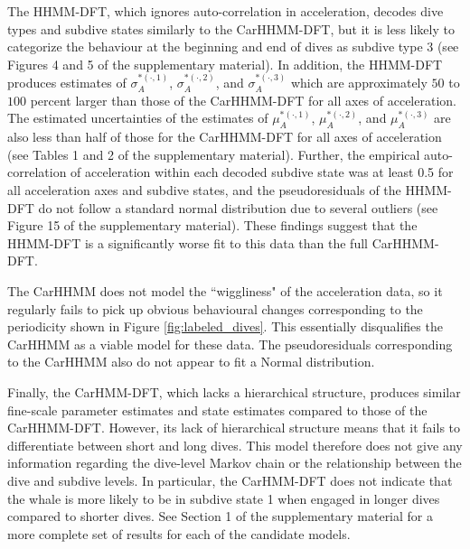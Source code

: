 The HHMM-DFT, which ignores auto-correlation in acceleration, decodes dive types and subdive states similarly to the CarHHMM-DFT, but it is less likely to categorize the behaviour at the beginning and end of dives as subdive type 3 (see Figures 4 and 5 of the supplementary material). In addition, the HHMM-DFT produces estimates of $\sigma_A^{*(\cdot,1)}$, $\sigma_A^{*(\cdot,2)}$, and $\sigma_A^{*(\cdot,3)}$ which are approximately $50$ to $100$ percent larger than those of the CarHHMM-DFT for all axes of acceleration. The estimated uncertainties of the estimates of $\mu_A^{*(\cdot,1)}$, $\mu_A^{*(\cdot,2)}$, and $\mu_A^{*(\cdot,3)}$ are also less than half of those for the CarHHMM-DFT for all axes of acceleration (see Tables 1 and 2 of the supplementary material). Further, the empirical auto-correlation of acceleration within each decoded subdive state was at least 0.5 for all acceleration axes and subdive states, and the pseudoresiduals of the HHMM-DFT do not follow a standard normal distribution due to several outliers (see Figure 15 of the supplementary material). These findings suggest that the HHMM-DFT is a significantly worse fit to this data than the full CarHHMM-DFT.

The CarHHMM does not model the ``wiggliness" of the acceleration data, so it regularly fails to pick up obvious behavioural changes corresponding to the periodicity shown in Figure \ref{fig:labeled_dives}. This essentially disqualifies the CarHHMM as a viable model for these data. The pseudoresiduals corresponding to the CarHHMM also do not appear to fit a Normal distribution.

Finally, the CarHMM-DFT, which lacks a hierarchical structure, produces similar fine-scale parameter estimates and state estimates compared to those of the CarHHMM-DFT. However, its lack of hierarchical structure means that it fails to differentiate between short and long dives. This model therefore does not give any information regarding the dive-level Markov chain or the relationship between the dive and subdive levels. In particular, the CarHMM-DFT does not indicate that the whale is more likely to be in subdive state 1 when engaged in longer dives compared to shorter dives. See Section 1 of the supplementary material for a more complete set of results for each of the candidate models.